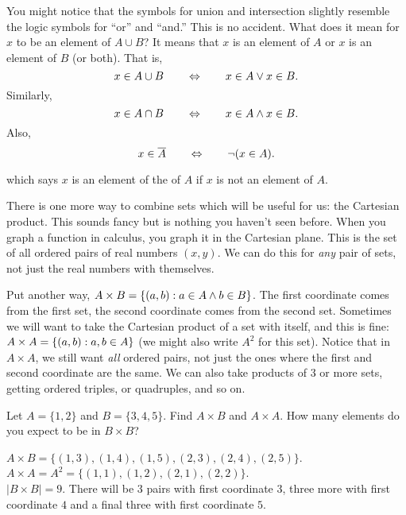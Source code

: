 \documentclass[12pt]{article}
\begin{document}
You might notice that the symbols for union and intersection slightly resemble the logic symbols for ``or'' and ``and.''  This is no accident.  What does it mean for $x$ to be an element of $A\cup B$?  It means that $x$ is an element of $A$ or $x$ is an element of $B$ (or both).  That is,
\[x \in A \cup B \qquad \Leftrightarrow \qquad x \in A \vee x \in B.\]
Similarly,
\[x \in A \cap B \qquad \Leftrightarrow \qquad x \in A \wedge x \in B.\]
Also,
\[x \in \overline A \qquad \Leftrightarrow \qquad \neg (x \in  A).\]


which says $x$ is an element of the \] of $A$ if $x$ is not an element of $A$.

There is one more way to combine sets which will be useful for us: the Cartesian product.  This sounds fancy but is nothing you haven't seen before.  When you graph a function in calculus, you graph it in the Cartesian plane.  This is the set of all ordered pairs of real numbers $(x,y)$.  We can do this for \emph{any} pair of sets, not just the real numbers with themselves.

Put another way, $A \times B = \{(a,b) : a \in A \wedge b \in B\}$.  The first coordinate comes from the first set, the second coordinate comes from the second set.  Sometimes we will want to take the Cartesian product of a set with itself, and this is fine: $A \times A = \{(a,b) : a, b \in A\}$ (we might also write $A^2$ for this set).  Notice that in $A \times A$, we still want \emph{all} ordered pairs, not just the ones where the first and second coordinate are the same.  We can also take products of 3 or more sets, getting ordered triples, or quadruples, and so on.

\begin{example}
Let $A = \{1,2\}$ and $B = \{3,4,5\}$.  Find $A \times B$ and $A \times A$.  How many elements do you expect to be in $B \times B$?
\begin{solution}
$A \times B = \{(1,3), (1,4), (1,5), (2,3), (2,4), (2,5)\}$.  \\ $A \times A = A^2 = \{(1,1), (1,2), (2,1), (2,2)\}$. \\
$|B\times B| = 9$.  There will be 3 pairs with first coordinate $3$, three more with first coordinate $4$ and a final three with first coordinate $5$.
\end{solution}
\end{example}
%
%
\end{document}
